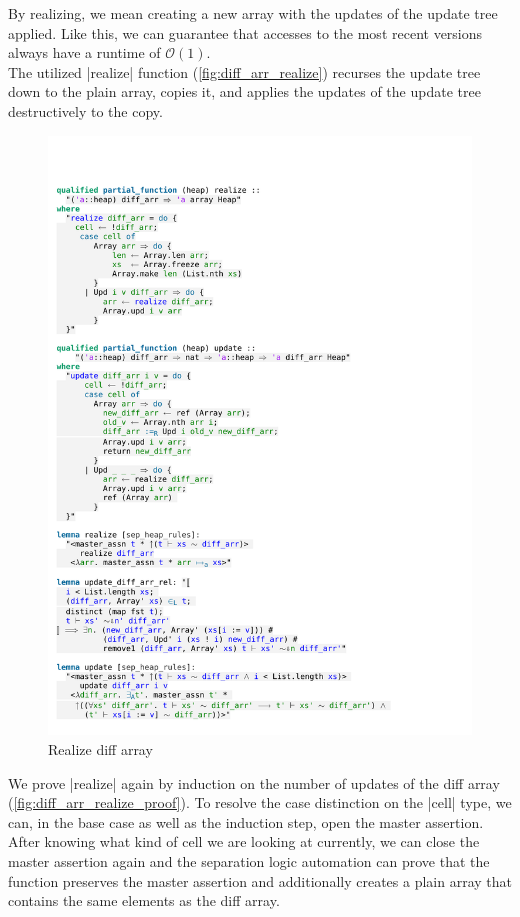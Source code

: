 \noindent By realizing, we mean creating a new array with the updates of the update tree applied. Like this, we can guarantee that accesses to the most recent versions always have a runtime of $\mathcal{O}(1)$. \\
The utilized |realize| function (\autoref{fig:diff_arr_realize}) recurses the update tree down to the plain array, copies it, and applies the updates of the update tree destructively to the copy.

\begin{figure}[htpb]
    \includegraphics[trim={0 19,8cm 0 2,4cm}, clip, width=1.00\textwidth]{figures/Theory_Diff_Arr_Update.pdf}
    \caption[Realize diff array]{Realize diff array}
    \label{fig:diff_arr_realize}
\end{figure}

\noindent We prove |realize| again by induction on the number of updates of the diff array (\autoref{fig:diff_arr_realize_proof}). To resolve the case distinction on the |cell| type, we can, in the base case as well as the induction step, open the master assertion. After knowing what kind of cell we are looking at currently, we can close the master assertion again and the separation logic automation can prove that the function preserves the master assertion and additionally creates a plain array that contains the same elements as the diff array.

